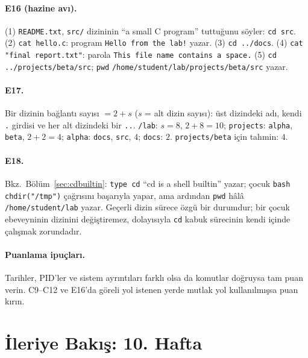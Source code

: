 \documentclass[11pt,a4paper]{article}
\newcommand{\cmd}[1]{\texttt{#1}}
\begin{document}
\paragraph{E16 (hazine avı).} (1) \texttt{README.txt}, \texttt{src/} dizininin ``a small C program'' tuttuğunu söyler: \cmd{cd src}. (2) \cmd{cat hello.c}: program \texttt{Hello from the lab!} yazar. (3) \cmd{cd ../docs}. (4) \cmd{cat "final report.txt"}: parola \texttt{This file name contains a space.} (5) \cmd{cd ../projects/beta/src}; \cmd{pwd} \texttt{/home/student/lab/projects/beta/src} yazar.

\paragraph{E17.} Bir dizinin bağlantı sayısı $= 2 + s$ ($s$ = alt dizin sayısı): üst dizindeki adı, kendi \texttt{.} girdisi ve her alt dizindeki bir \texttt{..}. \texttt{\tl/lab}: $s = 8$, $2+8 = 10$; \texttt{projects}: \texttt{alpha}, \texttt{beta}, $2+2 = 4$; \texttt{alpha}: \texttt{docs}, \texttt{src}, $4$; \texttt{docs}: $2$. \texttt{projects/beta} için tahmin: $4$.

\paragraph{E18.} Bkz.\ Bölüm~\ref{sec:cdbuiltin}: \cmd{type cd} ``cd is a shell builtin'' yazar; çocuk \cmd{bash} \texttt{chdir("/tmp")} çağrısını başarıyla yapar, ama ardından \cmd{pwd} hâlâ \texttt{/home/student/lab} yazar. Geçerli dizin sürece özgü bir durumdur; bir çocuk ebeveyninin dizinini değiştiremez, dolayısıyla \cmd{cd} kabuk sürecinin kendi içinde çalışmak zorundadır.

\paragraph{Puanlama ipuçları.} Tarihler, PID'ler ve sistem ayrıntıları farklı olsa da komutlar doğruysa tam puan verin. C9--C12 ve E16'da göreli yol istenen yerde mutlak yol kullanılmışsa puan kırın.

\section{İleriye Bakış: 10. Hafta}
\end{document}
